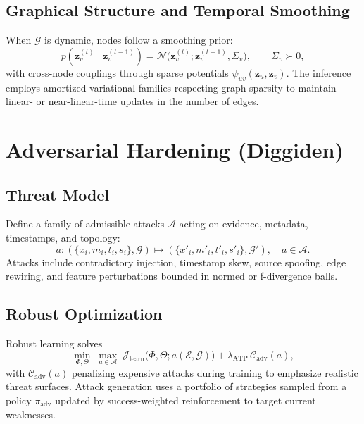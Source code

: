 \documentclass[12pt,a4paper]{article}
\begin{document}
\subsection{Graphical Structure and Temporal Smoothing}
When $\mathcal{G}$ is dynamic, nodes follow a smoothing prior:
\begin{equation}
\label{eq:rw}
 p(\mathbf{z}_v^{(t)} \mid \mathbf{z}_v^{(t-1)}) = \mathcal{N}\bigl(\mathbf{z}_v^{(t)}; \mathbf{z}_v^{(t-1)}, \Sigma_v\bigr),\qquad \Sigma_v \succ 0,
\end{equation}
with cross-node couplings through sparse potentials $\psi_{uv}(\mathbf{z}_u, \mathbf{z}_v)$. The inference employs amortized variational families respecting graph sparsity to maintain linear- or near-linear-time updates in the number of edges.

\section{Adversarial Hardening (Diggiden)}
\subsection{Threat Model}
Define a family of admissible attacks $\mathcal{A}$ acting on evidence, metadata, timestamps, and topology:
\begin{equation}
\label{eq:attacks}
 a: (\{x_i,m_i,t_i,s_i\}, \mathcal{G}) \mapsto (\{x'_i,m'_i,t'_i,s'_i\}, \mathcal{G}'), \quad a \in \mathcal{A}.
\end{equation}
Attacks include contradictory injection, timestamp skew, source spoofing, edge rewiring, and feature perturbations bounded in normed or f-divergence balls.

\subsection{Robust Optimization}
Robust learning solves
\begin{equation}
\label{eq:minimax}
 \min_{\Phi,\Theta} \; \max_{a \in \mathcal{A}} \; \mathcal{J}_{\text{learn}}\bigl(\Phi,\Theta; a(\mathcal{E},\mathcal{G})\bigr) + \lambda_{\text{ATP}}\, \mathcal{C}_{\text{adv}}(a),
\end{equation}
with $\mathcal{C}_{\text{adv}}(a)$ penalizing expensive attacks during training to emphasize realistic threat surfaces. Attack generation uses a portfolio of strategies sampled from a policy $\pi_{\text{adv}}$ updated by success-weighted reinforcement to target current weaknesses.
\end{document}
